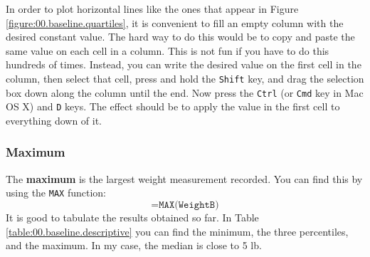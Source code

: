 In order to plot horizontal lines like the ones that appear in Figure \ref{figure:00.baseline.quartiles}, it is convenient to fill an empty column with the desired constant value. The hard way to do this would be to copy and paste the same value on each cell in a column. This is not fun if you have to do this hundreds of times. Instead, you can write the desired value on the first cell in the column, then select that cell, press and hold the \texttt{Shift} key, and drag the selection box down along the column until the end. Now press the \texttt{Ctrl} (or \texttt{Cmd} key in Mac OS X) and \texttt{D} keys. The effect should be to apply the value in the first cell to everything down of it.
\subsubsection{Maximum}
The \textbf{maximum} is the largest weight measurement recorded. You can find this by using the \texttt{MAX} function:
\begin{equation}
    \texttt{=MAX(WeightB)}
    \label{eq:00.max}
\end{equation}
It is good to tabulate the results obtained so far. In Table \ref{table:00.baseline.descriptive} you can find the minimum, the three percentiles, and the maximum. In my case, the median is close to 5 lb.
\begin{center}
\end{center}
